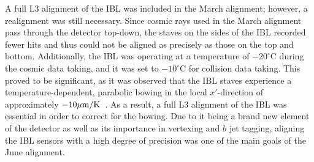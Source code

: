 A full L3 alignment of the IBL was included in the March alignment; however, a realignment was still necessary.
Since cosmic rays used in the March alignment pass through the detector top-down, the staves on the sides of the IBL recorded fewer hits and thus could not be aligned as precisely as those on the top and bottom.
Additionally, the IBL was operating at a temperature of $-20^{\circ}\textrm{C}$ during the cosmic data taking, and it was set to $-10^{\circ}\textrm{C}$ for collision data taking.
This proved to be significant, as it was observed that the IBL staves experience a temperature-dependent, parabolic bowing in the local $x'$-direction of approximately $-10\mu\textrm{m}/\textrm{K}$~\cite{2015.alignment-ibl-stability}.
As a result, a full L3 alignment of the IBL was essential in order to correct for the bowing.
Due to it being a brand new element of the detector as well as its importance in vertexing and $b$ jet tagging, aligning the IBL sensors with a high degree of precision was one of the main goals of the June alignment.


